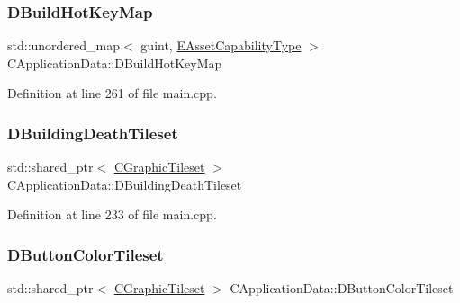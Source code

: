 \subsubsection{\texorpdfstring{D\+Build\+Hot\+Key\+Map}{DBuildHotKeyMap}}
{\footnotesize\ttfamily std\+::unordered\+\_\+map$<$ guint, \hyperlink{GameDataTypes_8h_a35b98ce26aca678b03c6f9f76e4778ce}{E\+Asset\+Capability\+Type} $>$ C\+Application\+Data\+::\+D\+Build\+Hot\+Key\+Map\hspace{0.3cm}{\ttfamily [protected]}}



Definition at line 261 of file main.\+cpp.

\hypertarget{classCApplicationData_ab463f816076fec8d43ecfe61120e8e6b}{}\label{classCApplicationData_ab463f816076fec8d43ecfe61120e8e6b} 
\subsubsection{\texorpdfstring{D\+Building\+Death\+Tileset}{DBuildingDeathTileset}}
{\footnotesize\ttfamily std\+::shared\+\_\+ptr$<$ \hyperlink{classCGraphicTileset}{C\+Graphic\+Tileset} $>$ C\+Application\+Data\+::\+D\+Building\+Death\+Tileset\hspace{0.3cm}{\ttfamily [protected]}}



Definition at line 233 of file main.\+cpp.

\hypertarget{classCApplicationData_a7482e0b4d7e0ce4979eb9f28872023ad}{}\label{classCApplicationData_a7482e0b4d7e0ce4979eb9f28872023ad} 
\subsubsection{\texorpdfstring{D\+Button\+Color\+Tileset}{DButtonColorTileset}}
{\footnotesize\ttfamily std\+::shared\+\_\+ptr$<$ \hyperlink{classCGraphicTileset}{C\+Graphic\+Tileset} $>$ C\+Application\+Data\+::\+D\+Button\+Color\+Tileset\hspace{0.3cm}{\ttfamily [protected]}}



